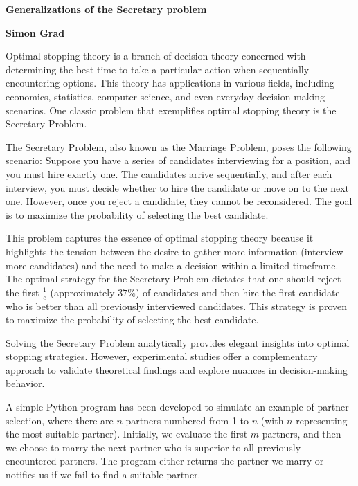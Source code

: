\documentclass[a4paper,12pt]{article}
\begin{document}
\begin{center}
    \Large
    \textbf{Generalizations of the Secretary problem}
        
    \vspace{0.4cm}
    \textbf{Simon Grad}
    \vspace{0.9cm}
    
\end{center}

    Optimal stopping theory is a branch of decision theory concerned with determining 
    the best time to take a particular action when sequentially encountering options. 
    This theory has applications in various fields, including economics, statistics, 
    computer science, and even everyday decision-making scenarios. 
    One classic problem that exemplifies optimal stopping theory is the Secretary Problem.

    The Secretary Problem, also known as the Marriage Problem, 
    poses the following scenario: 
    Suppose you have a series of candidates interviewing for a position, 
    and you must hire exactly one. The candidates arrive sequentially, 
    and after each interview, you must decide whether to hire the candidate or move on to 
    the next one. However, once you reject a candidate, they cannot be reconsidered. 
    The goal is to maximize the probability of selecting the best candidate.  

    This problem captures the essence of optimal stopping theory because it highlights 
    the tension between the desire to gather more information (interview more candidates) and 
    the need to make a decision within a limited timeframe. 
    The optimal strategy for the Secretary Problem dictates that one should 
    reject the first $\frac{1}{e}$
    (approximately $37\%$) of candidates and then hire the first candidate who is better 
    than all previously interviewed candidates. 
    This strategy is proven to maximize the probability of selecting the best candidate.
    
    Solving the Secretary Problem analytically provides elegant insights into optimal 
    stopping strategies. However, experimental studies offer a complementary approach to 
    validate theoretical findings and explore nuances in decision-making behavior.

    A simple Python program has been developed to simulate an example of partner selection, 
    where there are $n$ partners numbered from 1 to $n$ (with 
    $n$ representing the most suitable partner). Initially, we evaluate the first 
    $m$ partners, and then we choose to marry the next partner who is superior to all 
    previously encountered partners. The program either returns the partner we marry or 
    notifies us if we fail to find a suitable partner.
\end{document}
